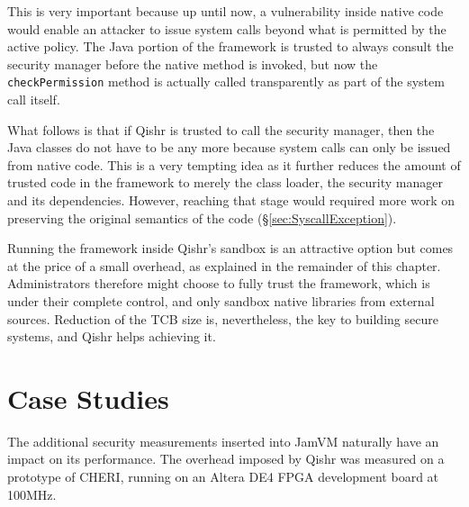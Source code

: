 \documentclass[a4paper,12pt,twoside,openright]{report}
\begin{document}
This is very important because up until now, a vulnerability inside native code would enable an attacker to issue system calls beyond what is permitted by the active policy. The Java portion of the framework is trusted to always consult the security manager before the native method is invoked, but now the \texttt{checkPermission} method is actually called transparently as part of the system call itself. 

What follows is that if Qishr is trusted to call the security manager, then the Java classes do not have to be any more because system calls can only be issued from native code. This is a very tempting idea as it further reduces the amount of trusted code in the framework to merely the class loader, the security manager and its dependencies. However, reaching that stage would required more work on preserving the original semantics of the code (\S\ref{sec:SyscallException}).

Running the framework inside Qishr's sandbox is an attractive option but comes at the price of a small overhead, as explained in the remainder of this chapter. Administrators therefore might choose to fully trust the framework, which is under their complete control, and only sandbox native libraries from external sources. Reduction of the TCB size is, nevertheless, the key to building secure systems, and Qishr helps achieving it.

\section{Case Studies}

The additional security measurements inserted into JamVM naturally have an impact on its performance. The overhead imposed by Qishr was measured on a prototype of CHERI, running on an Altera DE4 FPGA development board at 100MHz. 
\end{document}
